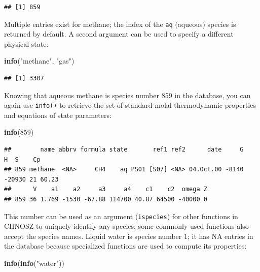 \documentclass[]{tufte-book}
\newenvironment{Shaded}{}{}
\newcommand{\KeywordTok}[1]{\textcolor[rgb]{0.00,0.44,0.13}{\textbf{#1}}}
\newcommand{\DecValTok}[1]{\textcolor[rgb]{0.25,0.63,0.44}{#1}}
\newcommand{\StringTok}[1]{\textcolor[rgb]{0.25,0.44,0.63}{#1}}
\newcommand{\NormalTok}[1]{#1}
\begin{document}
\begin{verbatim}
## [1] 859
\end{verbatim}

Multiple entries exist for methane; the index of the \texttt{aq}
(aqueous) species is returned by default. A second argument can be used
to specify a different physical state:

\begin{Shaded}
\begin{Highlighting}[]
\KeywordTok{info}\NormalTok{(}\StringTok{"methane"}\NormalTok{, }\StringTok{"gas"}\NormalTok{)}
\end{Highlighting}
\end{Shaded}

\begin{verbatim}
## [1] 3307
\end{verbatim}

Knowing that aqueous methane is species number 859 in the database, you
can again use {\texttt{info()}} to retrieve the set of standard molal
thermodynamic properties and equations of state parameters:

\begin{Shaded}
\begin{Highlighting}[]
\KeywordTok{info}\NormalTok{(}\DecValTok{859}\NormalTok{)}
\end{Highlighting}
\end{Shaded}

\begin{verbatim}
##        name abbrv formula state       ref1 ref2      date     G      H  S    Cp
## 859 methane  <NA>     CH4    aq PS01 [S07] <NA> 04.Oct.00 -8140 -20930 21 60.23
##      V    a1    a2     a3     a4    c1    c2  omega Z
## 859 36 1.769 -1530 -67.88 114700 40.87 64500 -40000 0
\end{verbatim}

This number can be used as an argument (\texttt{ispecies}) for other
functions in CHNOSZ to uniquely identify any species; some commonly used
functions also accept the species names. Liquid water is species number
1; it has NA entries in the database because specialized functions are
used to compute its properties:

\begin{Shaded}
\begin{Highlighting}[]
\KeywordTok{info}\NormalTok{(}\KeywordTok{info}\NormalTok{(}\StringTok{"water"}\NormalTok{))}
\end{Highlighting}
\end{Shaded}
\end{document}
